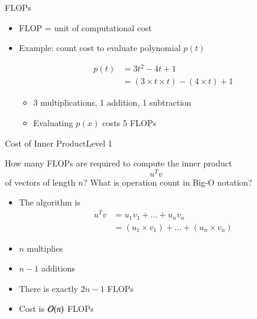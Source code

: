 \documentclass[10pt]{beamer}
\begin{document}
\begin{frame}{FLOPs}

\begin{itemize}
    \item FLOP = unit of computational cost
    \item Example: count cost to evaluate polynomial $p(t)$
        
        \begin{align*}
            p(t) &= 3t^2 - 4t + 1\\
                 &= (3\times t \times t) - (4\times t) + 1
        \end{align*}
    \begin{itemize}
    \item 3 multiplications, 1 addition, 1 subtraction
    \item Evaluating $p(x)$ costs 5 FLOPs
    \end{itemize}
\end{itemize}
\end{frame}

\begin{frame}[fragile]{Cost of Inner Product}{Level 1}
\begin{example}
    How many FLOPs are required to compute the inner product 
        $$ u^T v $$
    of vectors of length $n$? What is operation count in Big-O notation? 
\end{example}

\begin{itemize}
  \item The algorithm is
  \begin{align*}      
    u^T v &= u_1 v_1 + \dots + u_n v_n\\
          &= (u_1 \times v_1) + \dots + (u_n \times v_n)
  \end{align*}
  \item $n$ multiplies
  \item $n-1$ additions
  \item There is exactly $2n-1$ FLOPs 
  \item Cost is ${\mathcal{O}}(n)$ FLOPs
\end{itemize}
\end{frame}
\end{document}
